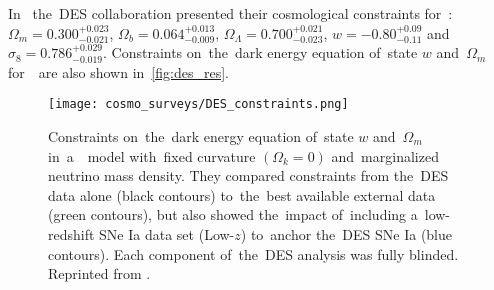In~\textcite{2019PhRvL.122q1301A} the~DES collaboration presented their cosmological constraints for~\wCDM: $\Omega_m=0.300^{+0.023}_{-0.021}$, $\Omega_b=0.064^{+0.013}_{-0.009}$, $\Omega_\Lambda=0.700^{+0.021}_{-0.023}$, $w=-0.80^{+0.09}_{-0.11}$ and~$\sigma_8=0.786^{+0.029}_{-0.019}$. Constraints on~the~dark energy equation of~state $w$ and~$\Omega_m$ for~\wCDM\ are also shown in~\autoref{fig:des_res}.

\begin{figure}[htb]
    \centering
    \texttt{[image: cosmo\_surveys/DES\_constraints.png]}
    \caption{Constraints on~the~dark energy equation of~state $w$ and~$\Omega_m$ in~a~\wCDM\ model with~fixed curvature $(\Omega_k=0)$ and~marginalized neutrino mass density. They compared constraints from the~DES data alone (black contours) to~the~best available external data (green contours), but also showed the~impact of~including a~low-redshift SNe Ia data set (Low-$z$) to~anchor the~DES SNe Ia (blue contours). Each component of~the~DES analysis was fully blinded. Reprinted from \textcite{2019PhRvL.122q1301A}.}
    \label{fig:des_res}
\end{figure}
